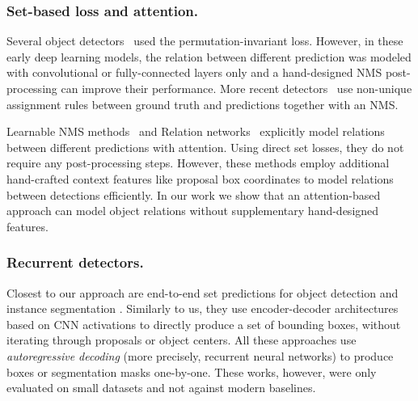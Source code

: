 \subsubsection{Set-based loss and attention.} 
Several object detectors~\cite{erhan2014scalable,Liu2016SSDSS,redmon2016you} used the permutation-invariant loss. However, in these early deep learning models, the relation between different prediction was modeled with convolutional or fully-connected layers only and a hand-designed NMS post-processing can improve their performance. More recent detectors~\cite{Ren2015FasterRT,Lin2017FocalLF,Zhou2019objects} use non-unique assignment rules between ground truth and predictions together with an NMS.


Learnable NMS methods~\cite{Hosang2017LearningNS,Bodla2017SoftNMSI} and Relation networks~\cite{Hu2017RelationNF} explicitly model relations between different predictions with attention. Using direct set losses, they do not require any post-processing steps. However, these methods employ additional hand-crafted context features like proposal box coordinates to model relations between detections efficiently. In our work we show that an attention-based approach can model object relations without supplementary hand-designed features.

\subsubsection{Recurrent detectors.} 
Closest to our approach are end-to-end set predictions for object detection  \cite{Stewart2015EndtoEndPD} and instance segmentation \cite{RomeraParedes2015RecurrentIS,Park2015LearningTD,ren2017end,Salvador2017RecurrentNN}. Similarly to us, they use encoder-decoder architectures based on CNN activations to directly produce a set of bounding boxes, without iterating through proposals or object centers. All these approaches use \emph{autoregressive decoding} (more precisely, recurrent neural networks) to produce boxes or segmentation masks one-by-one. These works, however, were only evaluated on small datasets and not against modern baselines. 



\fi